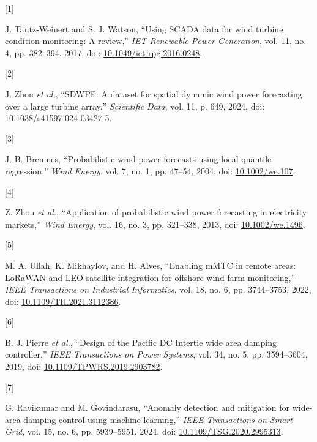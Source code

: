 \documentclass[
  journal]{IEEEtran}
\newlength{\cslhangindent}
\newlength{\csllabelwidth}
\newenvironment{CSLReferences}[2] %
 {\begin{list}{}{%
  \setlength{\itemindent}{0pt}
  \setlength{\leftmargin}{0pt}
  \setlength{\parsep}{0pt}
  \ifodd #1
   \setlength{\leftmargin}{\cslhangindent}
   \setlength{\itemindent}{-1\cslhangindent}
  \fi
  \setlength{\itemsep}{#2\baselineskip}}}
 {\end{list}}
\newcommand{\CSLLeftMargin}[1]{\parbox[t]{\csllabelwidth}{\strut#1\strut}}
\newcommand{\CSLRightInline}[1]{\parbox[t]{\linewidth - \csllabelwidth}{\strut#1\strut}}
\begin{document}
\protect{}\label{refs}
\begin{CSLReferences}{0}{0}
\CSLLeftMargin{{[}1{]} }%
\CSLRightInline{J. Tautz-Weinert and S. J. Watson, {``Using SCADA data
for wind turbine condition monitoring: A review,''} \emph{IET Renewable
Power Generation}, vol. 11, no. 4, pp. 382--394, 2017, doi:
\href{https://doi.org/10.1049/iet-rpg.2016.0248}{10.1049/iet-rpg.2016.0248}.}

\CSLLeftMargin{{[}2{]} }%
\CSLRightInline{J. Zhou \emph{et al.}, {``SDWPF: A dataset for spatial
dynamic wind power forecasting over a large turbine array,''}
\emph{Scientific Data}, vol. 11, p. 649, 2024, doi:
\href{https://doi.org/10.1038/s41597-024-03427-5}{10.1038/s41597-024-03427-5}.}

\CSLLeftMargin{{[}3{]} }%
\CSLRightInline{J. B. Bremnes, {``Probabilistic wind power forecasts
using local quantile regression,''} \emph{Wind Energy}, vol. 7, no. 1,
pp. 47--54, 2004, doi:
\href{https://doi.org/10.1002/we.107}{10.1002/we.107}.}

\CSLLeftMargin{{[}4{]} }%
\CSLRightInline{Z. Zhou \emph{et al.}, {``Application of probabilistic
wind power forecasting in electricity markets,''} \emph{Wind Energy},
vol. 16, no. 3, pp. 321--338, 2013, doi:
\href{https://doi.org/10.1002/we.1496}{10.1002/we.1496}.}

\CSLLeftMargin{{[}5{]} }%
\CSLRightInline{M. A. Ullah, K. Mikhaylov, and H. Alves, {``Enabling
{mMTC} in remote areas: {LoRaWAN} and {LEO} satellite integration for
offshore wind farm monitoring,''} \emph{IEEE Transactions on Industrial
Informatics}, vol. 18, no. 6, pp. 3744--3753, 2022, doi:
\href{https://doi.org/10.1109/TII.2021.3112386}{10.1109/TII.2021.3112386}.}

\CSLLeftMargin{{[}6{]} }%
\CSLRightInline{B. J. Pierre \emph{et al.}, {``Design of the {Pacific DC
Intertie} wide area damping controller,''} \emph{IEEE Transactions on
Power Systems}, vol. 34, no. 5, pp. 3594--3604, 2019, doi:
\href{https://doi.org/10.1109/TPWRS.2019.2903782}{10.1109/TPWRS.2019.2903782}.}

\CSLLeftMargin{{[}7{]} }%
\CSLRightInline{G. Ravikumar and M. Govindarasu, {``Anomaly detection
and mitigation for wide-area damping control using machine learning,''}
\emph{IEEE Transactions on Smart Grid}, vol. 15, no. 6, pp. 5939--5951,
2024, doi:
\href{https://doi.org/10.1109/TSG.2020.2995313}{10.1109/TSG.2020.2995313}.}

\end{CSLReferences}
\end{document}
